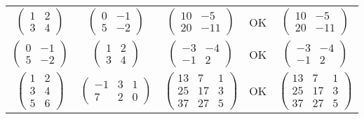\begin{table}[H]
\begin{tabular}{|c|c|c|c|c|}
        $\left( \begin{matrix} 1 & 2 \\ 3 & 4 \end{matrix} \right)$ & $\left( \begin{matrix} 0 & -1 \\ 5 & -2 \end{matrix} \right)$ & $\left( \begin{matrix} 10 & -5 \\ 20 & -11 \end{matrix} \right)$ & OK & $\left( \begin{matrix} 10 & -5 \\ 20 & -11 \end{matrix} \right)$ \\
        $\left( \begin{matrix} 0 & -1 \\ 5 & -2 \end{matrix} \right)$ & $\left( \begin{matrix} 1 & 2 \\ 3 & 4 \end{matrix} \right)$ & $\left( \begin{matrix} -3 & -4 \\ -1 & 2 \end{matrix} \right)$ & OK & $\left( \begin{matrix} -3 & -4 \\ -1 & 2 \end{matrix} \right)$ \\
        $\left( \begin{matrix} 1 & 2 \\ 3 & 4 \\ 5 & 6 \end{matrix} \right)$ & $\left( \begin{matrix} -1 & 3 & 1 \\ 7 & 2 & 0 \end{matrix} \right)$ & $\left( \begin{matrix} 13 & 7 & 1 \\ 25 & 17 & 3 \\ 37 & 27 & 5 \end{matrix} \right)$ & OK & $\left( \begin{matrix} 13 & 7 & 1 \\ 25 & 17 & 3 \\ 37 & 27 & 5 \end{matrix} \right)$ \\
        \hline
    \end{tabular}
    \label{table:tests}
\end{table}

